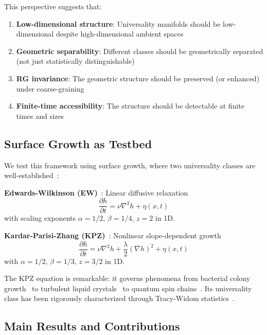 \documentclass[aps,pre,twocolumn,superscriptaddress,showpacs,longbibliography]{revtex4-2}
\begin{document}
This perspective suggests that:
\begin{enumerate}
\item \textbf{Low-dimensional structure}: Universality manifolds should be low-dimensional despite high-dimensional ambient spaces
\item \textbf{Geometric separability}: Different classes should be geometrically separated (not just statistically distinguishable)
\item \textbf{RG invariance}: The geometric structure should be preserved (or enhanced) under coarse-graining
\item \textbf{Finite-time accessibility}: The structure should be detectable at finite times and sizes
\end{enumerate}

\subsection{Surface Growth as Testbed}

We test this framework using surface growth, where two universality classes are well-established~\cite{Barabasi1995,HalpinHealy2015}:

\textbf{Edwards-Wilkinson (EW)}~\cite{Edwards1982}: Linear diffusive relaxation
\begin{equation}
\frac{\partial h}{\partial t} = \nu \nabla^2 h + \eta(x,t)
\label{eq:ew}
\end{equation}
with scaling exponents $\alpha = 1/2$, $\beta = 1/4$, $z = 2$ in 1D.

\textbf{Kardar-Parisi-Zhang (KPZ)}~\cite{Kardar1986}: Nonlinear slope-dependent growth
\begin{equation}
\frac{\partial h}{\partial t} = \nu \nabla^2 h + \frac{\lambda}{2}(\nabla h)^2 + \eta(x,t)
\label{eq:kpz}
\end{equation}
with $\alpha = 1/2$, $\beta = 1/3$, $z = 3/2$ in 1D.

The KPZ equation is remarkable: it governs phenomena from bacterial colony growth~\cite{Hallatschek2007} to turbulent liquid crystals~\cite{Takeuchi2010} to quantum spin chains~\cite{Ljubotina2019}. Its universality class has been rigorously characterized through Tracy-Widom statistics~\cite{Tracy1994,Corwin2012,Matetski2021}.

\subsection{Main Results and Contributions}
\end{document}
